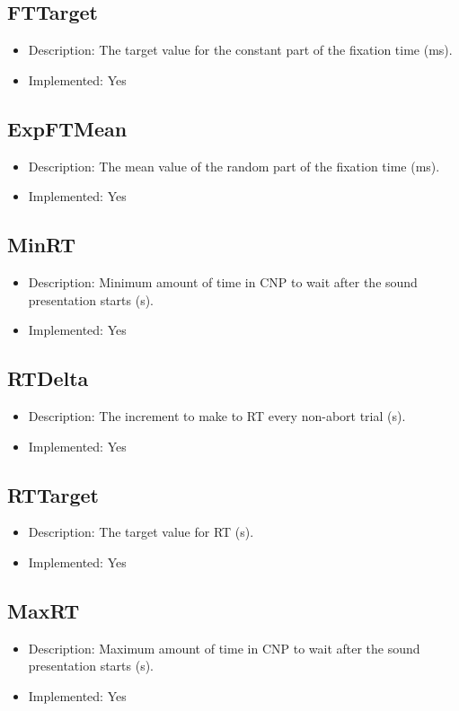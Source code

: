 \subsection*{FTTarget}
\begin{itemize}
	\item Description: The target value for the constant part of the fixation time (ms).
	\item Implemented: Yes
\end{itemize}

\subsection*{ExpFTMean}
\begin{itemize}
	\item Description: The mean value of the random part of the fixation time (ms).
	\item Implemented: Yes
\end{itemize}

\subsection*{MinRT}
\begin{itemize}
	\item Description: Minimum amount of time in CNP to wait after the sound presentation starts (s).
	\item Implemented: Yes
\end{itemize}

\subsection*{RTDelta}
\begin{itemize}
	\item Description: The increment to make to RT every non-abort trial (s).
	\item Implemented: Yes
\end{itemize}

\subsection*{RTTarget}
\begin{itemize}
	\item Description: The target value for RT (s).
	\item Implemented: Yes
\end{itemize}

\subsection*{MaxRT}
\begin{itemize}
	\item Description: Maximum amount of time in CNP to wait after the sound presentation starts (s).
	\item Implemented: Yes
\end{itemize}

